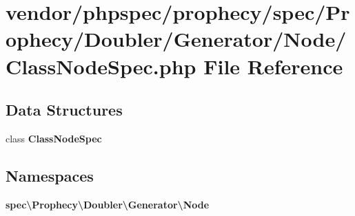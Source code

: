 \section{vendor/phpspec/prophecy/spec/\+Prophecy/\+Doubler/\+Generator/\+Node/\+Class\+Node\+Spec.php File Reference}
\label{_class_node_spec_8php}
\subsection*{Data Structures}
\begin{DoxyCompactItemize}
\item 
class {\bf Class\+Node\+Spec}
\end{DoxyCompactItemize}
\subsection*{Namespaces}
\begin{DoxyCompactItemize}
\item 
 {\bf spec\textbackslash{}\+Prophecy\textbackslash{}\+Doubler\textbackslash{}\+Generator\textbackslash{}\+Node}
\end{DoxyCompactItemize}
